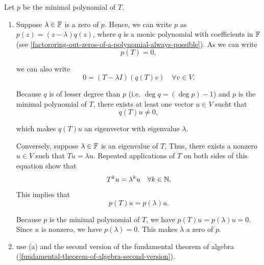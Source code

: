 \begin{prf} Let $p$ be the minimal polynomial of $T$.
  \begin{enumerate}[label=\textbf{(\alph*)}]
    \item \Rightarrowdirection Suppose $\lambda \in \mathbb{F}$ is a zero of $p$. Hence, we can write $p$ as $p(z)=(z-\lambda)q(z)$, where $q$ is a monic polynomial with coefficients in $\mathbb{F}$ (see \ref{factororing-out-zeros-of-a-polynomial-always-possible}). As we can write
    \begin{equation}
      p(T)=0,
    \end{equation}

    we can also write
    \begin{equation}
      0=(T-\lambda I)(q(T)v) \quad \forall v\in V.
    \end{equation}

    Because $q$ is of lesser degree than $p$ (i.e. $\deg q = (\deg p) -1$) and $p$ is the minimal polynomial of $T$, there exists at least one vector $u\in V$ sucht that
    \begin{equation}
      q(T)u \neq 0,
    \end{equation}

    which makes $q(T)u$ an eigenvector with eigenvalue $\lambda$.

    \Leftarrowdirection Conversely, suppose $\lambda \in \mathbb{F}$ is an eigenvalue of $T$. Thus, there exists a nonzero $u\in V$ such that $Tu=\lambda u$. Repeated applications of $T$ on both sides of this equation show that
    \begin{equation}
      T^ku =\lambda^k u \quad \forall k\in \mathbb{N}.
    \end{equation}

    This implies that
    \begin{equation}
      p(T)u=p(\lambda)u.
    \end{equation}

    Because $p$ is the minimal polynomial of $T$, we have $p(T)u=p(\lambda)u=0$. Since $u$ is nonzero, we have $p(\lambda) = 0$. This makes $\lambda$ a zero of $p$.

    \item use (a) and the second version of the fundamental theorem of algebra (\ref{fundamental-theorem-of-algebra-second-version}).
  \end{enumerate}
  \vspace*{-\baselineskip}
\end{prf}

